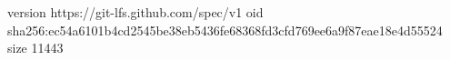 version https://git-lfs.github.com/spec/v1
oid sha256:ec54a6101b4cd2545be38eb5436fe68368fd3cfd769ee6a9f87eae18e4d55524
size 11443

